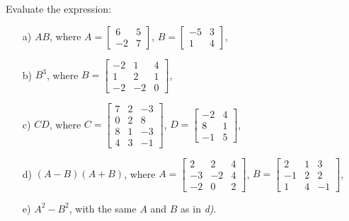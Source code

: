 



\begin{problem}[2 points]
    Evaluate the expression:

    \begin{enumerate}
        \item[a) ] $AB$, where $A=\begin{bmatrix}
        6&5\\-2&7  \end{bmatrix}$, $B=\begin{bmatrix}
        -5&3\\1&4   \end{bmatrix}$,

        \item[b) ] $B^3$, where $B=\begin{bmatrix}
        -2&1&4\\1&2&1\\-2&-2&0   \end{bmatrix}$,

        \item[c) ] $CD$, where $C=\begin{bmatrix}
        7&2&-3\\0&2&8\\8&1&-3\\4&3&-1   \end{bmatrix}$, $D=\begin{bmatrix}
            -2&4\\8&1\\-1&5
        \end{bmatrix}$,
        
        \item[d) ] $(A-B)(A+B)$, where $A=\begin{bmatrix}
        2&2&4\\-3&-2&4\\-2&0&2   \end{bmatrix}$, $B=\begin{bmatrix}
        2&1&3\\-1&2&2\\1&4&-1   \end{bmatrix}$,
        
        \item[e) ] $A^2 - B^2$, with the same $A$ and $B$ as in \textit{d)}.
    \end{enumerate}
\end{problem}
\bigskip

